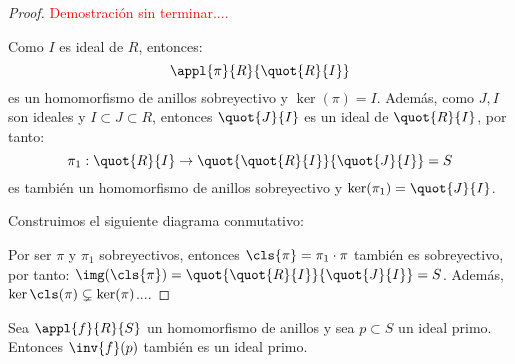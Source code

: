 \begin{proof}
\textcolor{red}{Demostración sin terminar....}

Como $I$ es ideal de $R$, entonces:
\[ \appl{\pi}{R}{\quot{R}{I}} \]
es un homomorfismo de anillos sobreyectivo y $\ker(\pi)=I$. Además, como $J,I$ son ideales y $I\subset J \subset R$, entonces $\quot{J}{I}$ es un ideal de $\quot{R}{I}$, por tanto:
\[
	\pi_1: \quot{R}{I} \rightarrow \quot{\quot{R}{I}}{\quot{J}{I}}=S
\]
es también un homomorfismo de anillos sobreyectivo y $\ker(\pi_1)=\quot{J}{I}$.

Construimos el siguiente diagrama conmutativo:

\begin{center}
\end{center}

Por ser $\pi$ y $\pi_1$ sobreyectivos, entonces $\cls{\pi}=\pi_1\cdot\pi$ también es sobreyectivo, por tanto: $\img(\cls{\pi})=\quot{\quot{R}{I}}{\quot{J}{I}}=S$. Además, $\ker{\cls(\pi)} \subsetneq \ker(\pi)$....

\end{proof}

\begin{corol} Sea $\appl{f}{R}{S}$ un homomorfismo de anillos y sea $p ⊂ S$ un ideal primo. Entonces $\inv{f}(p)$ también es un ideal primo.
\end{corol}

